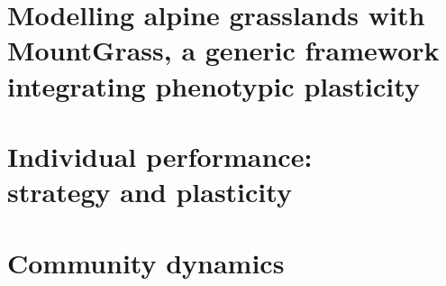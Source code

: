 \documentclass[a4paper, notoc, justified,marginals=left, nobib]{tufte-book}
\newcommand{\model}{\textit{\texttt{MountGrass}}}
\begin{document}
\part[Modelling alpine grasslands with MountGrass, a generic framework integrating phenotypic plasticity]{Modelling alpine grasslands with\\MountGrass, a generic framework\\integrating phenotypic plasticity}\label{part:model}
\setcounter{chapter}{0}
\begin{refsection}

%




\begin{fullwidth}
\printbibliography[heading=bibliography] 
\end{fullwidth}
\end{refsection}


\part[Individual performance: strategy and plasticity]{Individual performance:\\strategy and plasticity}\label{part:individuals}

\begin{refsection}
\setcounter{chapter}{0}


\begin{fullwidth}
\printbibliography[heading=bibliography] 
\end{fullwidth}
\end{refsection}

\part{Community dynamics}\label{part:community}

\begin{refsection}
\setcounter{chapter}{0}


\begin{fullwidth}
\printbibliography[heading=bibliography] 
\end{fullwidth}
\end{refsection}
\end{document}
